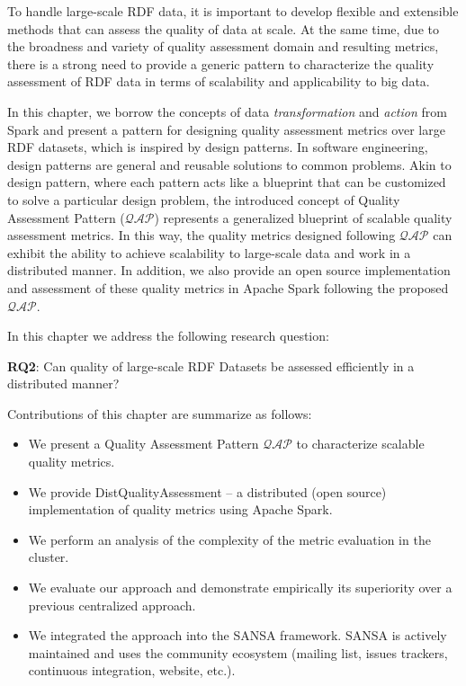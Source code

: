 To handle large-scale \gls{RDF} data, it is important to develop flexible and extensible methods that can assess the quality of data at scale. 
At the same time, due to the broadness and variety of quality assessment domain and resulting metrics, there is a strong need to provide a generic pattern to characterize the quality assessment of \gls{RDF} data in terms of scalability and applicability to big data.

In this chapter, we borrow the concepts of data \textit{transformation} and \textit{action} from Spark and present a pattern for designing quality assessment metrics over large \gls{RDF} datasets, which is inspired by design patterns.
In software engineering, design patterns are general and reusable solutions to common problems. 
Akin to design pattern, where each pattern acts like a blueprint that can be customized to solve a particular design problem, 
the introduced concept of Quality Assessment Pattern ($\mathcal{QAP}$) represents a generalized blueprint of scalable quality assessment metrics. 
In this way, the quality metrics designed following $\mathcal{QAP}$ can exhibit the ability to achieve scalability to large-scale data and work in a distributed manner.
In addition, we also provide an open source implementation and assessment of these quality metrics in Apache Spark following the proposed $\mathcal{QAP}$.

In this chapter we address the following research question:

\begin{tcolorbox}
\textbf{RQ2}: Can quality of large-scale \gls{RDF} Datasets be assessed efficiently in a distributed manner?
\end{tcolorbox}

Contributions of this chapter are summarize as follows:
\begin{itemize}
    \item We present a Quality Assessment Pattern $\mathcal{QAP}$ to characterize scalable quality metrics.
    \item We provide DistQualityAssessment -- a distributed (open source) implementation of quality metrics using Apache Spark.
    \item We perform an analysis of the complexity of the metric evaluation in the cluster.
    \item We evaluate our approach and demonstrate empirically its superiority over a previous centralized approach.
    \item We integrated the approach into the SANSA framework.
    SANSA is actively maintained and uses the community ecosystem (mailing list, issues trackers, continuous integration, website, etc.).
\end{itemize}


